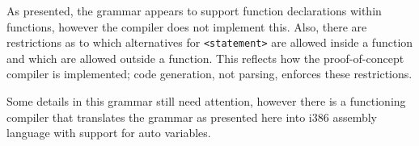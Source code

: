 As presented, the grammar appears to support function declarations within functions, however the compiler does not
implement this.  Also, there are restrictions as to which alternatives for \verb_<statement>_ are allowed inside a
function and which are allowed outside a function.  This reflects how the proof-of-concept compiler is implemented;
code generation, not parsing, enforces these restrictions.

Some details in this grammar still need attention, however there is a functioning compiler that translates the grammar
as presented here into i386 assembly language with support for auto variables.
